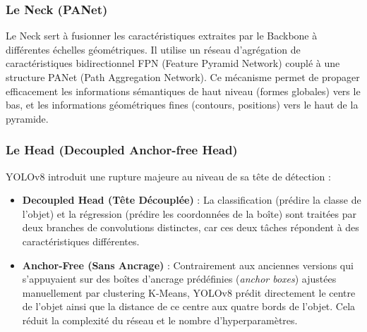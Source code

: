 \documentclass[12pt,a4paper]{article}
\begin{document}
\subsubsection{Le Neck (PANet)}
Le Neck sert à fusionner les caractéristiques extraites par le Backbone à différentes échelles géométriques. Il utilise un réseau d'agrégation de caractéristiques bidirectionnel FPN (Feature Pyramid Network) couplé à une structure PANet (Path Aggregation Network). Ce mécanisme permet de propager efficacement les informations sémantiques de haut niveau (formes globales) vers le bas, et les informations géométriques fines (contours, positions) vers le haut de la pyramide.

\subsubsection{Le Head (Decoupled Anchor-free Head)}
YOLOv8 introduit une rupture majeure au niveau de sa tête de détection :
\begin{itemize}
  \item \textbf{Decoupled Head (Tête Découplée)} : La classification (prédire la classe de l'objet) et la régression (prédire les coordonnées de la boîte) sont traitées par deux branches de convolutions distinctes, car ces deux tâches répondent à des caractéristiques différentes.
  \item \textbf{Anchor-Free (Sans Ancrage)} : Contrairement aux anciennes versions qui s'appuyaient sur des boîtes d'ancrage prédéfinies (\textit{anchor boxes}) ajustées manuellement par clustering K-Means, YOLOv8 prédit directement le centre de l'objet ainsi que la distance de ce centre aux quatre bords de l'objet. Cela réduit la complexité du réseau et le nombre d'hyperparamètres.
\end{itemize}
\end{document}
